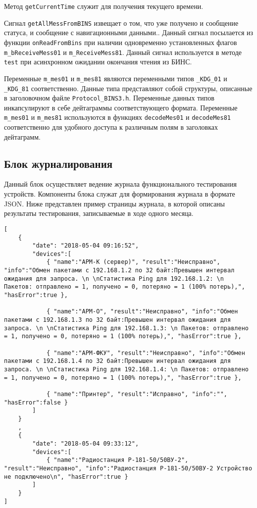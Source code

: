 \begin{enum}
	\item Метод \texttt{getCurrentTime} служит для получения текущего времени.

	\item Сигнал \texttt{getAllMessFromBINS} извещает о том, что уже получено и сообщение статуса, и сообщение с
		навигационными данными.. Данный сигнал посылается из функции \texttt{onReadFromBins} при наличии
		одновременно установленных флагов
		\texttt{m\_bReceiveMess01} и \texttt{m\_ReceiveMess81}. Данный сигнал используется в методе
		\texttt{test} при асинхронном ожидании окончания чтения из БИНС.

	\item Переменные \texttt{m\_mes01} и \texttt{m\_mes81} являются переменными типов \texttt{\_KDG\_01} и
		\texttt{\_KDG\_81} соответственно. Данные типа представляют собой структуры, описанные в заголовочном
		файле \texttt{Protocol\_BINS3.h}. Переменные данных типов инкапсулируют в себе дейтаграммы
		соответствующего формата. Переменные \texttt{m\_mes01} и \texttt{m\_mes81} используются в функциях
		\texttt{decodeMes01} и \texttt{decodeMes81} соответственно для удобного доступа к различным полям в
		заголовках дейтаграмм.
\end{enum}

\subsection{Блок журналирования}
Данный блок осуществляет ведение журнала функционального тестирования устройств. Компоненты блока служат для
формирования журнала в формате JSON.
Ниже представлен пример страницы журнала, в которой описаны результаты тестирования, записываемые в ходе одного месяца.
\medskip
\begin{verbatim}
[
	{
		"date": "2018-05-04 09:16:52",
		"devices":[
			{ "name":"АРМ-К (сервер)", "result":"Неисправно", "info":"Обмен пакетами с 192.168.1.2 по 32 байт:Превышен интервал ожидания для запроса. \n \nСтатистика Ping для 192.168.1.2: \n Пакетов: отправлено = 1, получено = 0, потеряно = 1 (100% потерь),", "hasError":true },

			{ "name":"АРМ-О", "result":"Неисправно", "info":"Обмен пакетами с 192.168.1.3 по 32 байт:Превышен интервал ожидания для запроса. \n \nСтатистика Ping для 192.168.1.3: \n Пакетов: отправлено = 1, получено = 0, потеряно = 1 (100% потерь),", "hasError":true },

			{ "name":"АРМ-ФКУ", "result":"Неисправно", "info":"Обмен пакетами с 192.168.1.4 по 32 байт:Превышен интервал ожидания для запроса. \n \nСтатистика Ping для 192.168.1.4: \n Пакетов: отправлено = 1, получено = 0, потеряно = 1 (100% потерь),", "hasError":true },

			{ "name":"Принтер", "result":"Исправно", "info":"", "hasError":false }
		]
	}
	,
	{
		"date": "2018-05-04 09:33:12",
		"devices":[
			{ "name":"Радиостанция Р-181-50/50ВУ-2", "result":"Неисправно", "info":"Радиостанция Р-181-50/50ВУ-2 Устройство не подключено\n", "hasError":true }
		]
	}
]

\end{verbatim}

